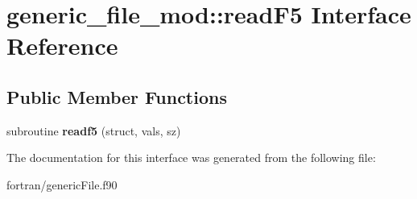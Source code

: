 \hypertarget{interfacegeneric__file__mod_1_1read_f5}{}\section{generic\+\_\+file\+\_\+mod\+:\+:read\+F5 Interface Reference}
\label{interfacegeneric__file__mod_1_1read_f5}
\subsection*{Public Member Functions}
\begin{DoxyCompactItemize}
\item 
\mbox{\label{interfacegeneric__file__mod_1_1read_f5_a844bbcdf944594a2bf52aae0eb77725a}} 
subroutine {\bfseries readf5} (struct, vals, sz)
\end{DoxyCompactItemize}


The documentation for this interface was generated from the following file\+:\begin{DoxyCompactItemize}
\item 
fortran/generic\+File.\+f90\end{DoxyCompactItemize}
